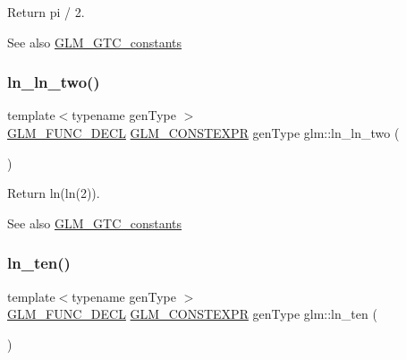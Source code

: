 Return pi / 2. \begin{DoxySeeAlso}{See also}
\hyperlink{group__gtc__constants}{G\+L\+M\+\_\+\+G\+T\+C\+\_\+constants} 
\end{DoxySeeAlso}
\mbox{\label{group__gtc__constants_gaca94292c839ed31a405ab7a81ae7e850}} 
\subsubsection{\texorpdfstring{ln\+\_\+ln\+\_\+two()}{ln\_ln\_two()}}
{\footnotesize\ttfamily template$<$typename gen\+Type $>$ \\
\hyperlink{setup_8hpp_ab2d052de21a70539923e9bcbf6e83a51}{G\+L\+M\+\_\+\+F\+U\+N\+C\+\_\+\+D\+E\+CL} \hyperlink{setup_8hpp_a08b807947b47031d3a511f03f89645ad}{G\+L\+M\+\_\+\+C\+O\+N\+S\+T\+E\+X\+PR} gen\+Type glm\+::ln\+\_\+ln\+\_\+two (\begin{DoxyParamCaption}{ }\end{DoxyParamCaption})}

Return ln(ln(2)). \begin{DoxySeeAlso}{See also}
\hyperlink{group__gtc__constants}{G\+L\+M\+\_\+\+G\+T\+C\+\_\+constants} 
\end{DoxySeeAlso}
\mbox{\label{group__gtc__constants_gaf97ebc6c059ffd788e6c4946f71ef66c}} 
\subsubsection{\texorpdfstring{ln\+\_\+ten()}{ln\_ten()}}
{\footnotesize\ttfamily template$<$typename gen\+Type $>$ \\
\hyperlink{setup_8hpp_ab2d052de21a70539923e9bcbf6e83a51}{G\+L\+M\+\_\+\+F\+U\+N\+C\+\_\+\+D\+E\+CL} \hyperlink{setup_8hpp_a08b807947b47031d3a511f03f89645ad}{G\+L\+M\+\_\+\+C\+O\+N\+S\+T\+E\+X\+PR} gen\+Type glm\+::ln\+\_\+ten (\begin{DoxyParamCaption}{ }\end{DoxyParamCaption})}

